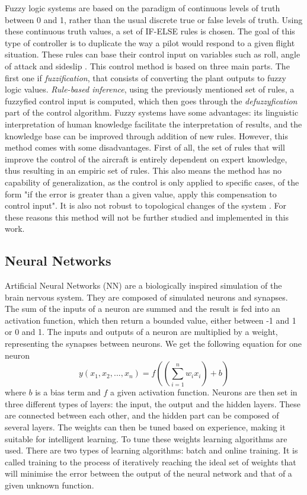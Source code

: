 Fuzzy logic systems are based on the paradigm of continuous levels of truth between 0 and 1, rather than the usual discrete true or false levels of truth. Using these continuous truth values, a set of IF-ELSE rules is chosen. The goal of this type of controller is to duplicate the way a pilot would respond to a given flight situation. These rules can base their control input on variables such as roll, angle of attack and sideslip \cite{Comparison_IntelligentSys}. This control method is based on three main parts. The first one if \textit{fuzzification}, that consists of converting the plant outputs to fuzzy logic values. \textit{Rule-based inference}, using the previously mentioned set of rules, a fuzzyfied control input is computed, which then goes through the \textit{defuzzyfication} part of the control algorithm. 
Fuzzy systems have some advantages: its linguistic interpretation of human knowledge facilitate the interpretation of results, and the knowledge base can be improved through addition of new rules. However, this method comes with some disadvantages. First of all, the set of rules that will improve the control of the aircraft is entirely dependent on expert knowledge, thus resulting in an empiric set of rules. This also means the method has no capability of generalization, as the control is only applied to specific cases, of the form "if the error is greater than a given value, apply this compensation to control input". It is also not robust to topological changes of the system \cite{Neuro_fuzzy_survey}. For these reasons this method will not be further studied and implemented in this work.


\subsection{Neural Networks}
\label{section:background/NN}

Artificial Neural Networks (NN) are a biologically inspired simulation of the brain nervous system. They are composed of simulated neurons and synapses. The sum of the inputs of a neuron are summed and the result is fed into an activation function, which then return a bounded value, either between -1 and 1 or 0 and 1. The inputs and outputs of a neuron are multiplied by a weight, representing the synapses between neurons. We get the following equation for one neuron
\begin{equation}
y(x_1,x_2,...,x_n)=f((\sum ^n_{i=1} w_i x_i)+b)
\end{equation}
where $b$ is a bias term and $f$ a given activation function. Neurons are then set in three different types of layers: the input, the output and the hidden layers. These are connected between each other, and the hidden part can be composed of several layers. The weights can then be tuned based on experience, making it suitable for intelligent learning. To tune these weights learning algorithms are used. There are two types of learning algorithms: batch and online training. It is called training to the process of iteratively reaching the ideal set of weights that will minimise the error between the output of the neural network and that of a given unknown function.

